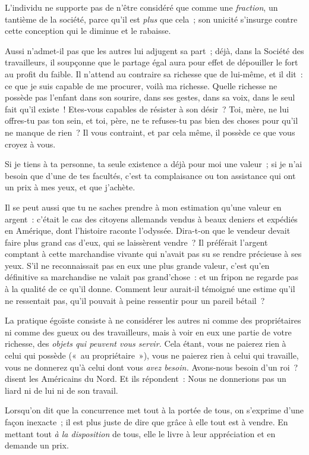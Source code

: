 \documentclass[french,twoside]{book} %
\begin{document}
L’individu ne supporte pas de n’être considéré que comme une \emph{fraction}, un tantième de la société, parce qu’il est \emph{plus} que cela ; son unicité s’insurge contre cette conception qui le diminue et le rabaisse.\par
Aussi n’admet-il pas que les autres lui adjugent sa part ; déjà, dans la Société des travailleurs, il soupçonne  que le partage égal aura pour effet de dépouiller le fort au profit du faible. Il n’attend au contraire sa richesse que de lui-même, et il dit : ce que je suis capable de me procurer, voilà ma richesse. Quelle richesse ne possède pas l’enfant dans son sourire, dans ses gestes, dans sa voix, dans le seul fait qu’il existe ! Etes-vous capables de résister à son désir ? Toi, mère, ne lui offres-tu pas ton sein, et toi, père, ne te refuses-tu pas bien des choses pour qu’il ne manque de rien ? Il vous contraint, et par cela même, il possède ce que vous croyez à vous.\par
Si je tiens à ta personne, ta seule existence a déjà pour moi une valeur ; si je n’ai besoin que d’une de tes facultés, c’est ta complaisance ou ton assistance qui ont un prix à mes yeux, et que j’achète.\par
Il se peut aussi que tu ne saches prendre à mon estimation qu’une valeur en argent : c’était le cas des citoyens allemands vendus à beaux deniers et expédiés en Amérique, dont l’histoire raconte l’odyssée. Dira-t-on que le vendeur devait faire plus grand cas d’eux, qui se laissèrent vendre ? Il préférait l’argent comptant à cette marchandise vivante qui n’avait pas su se rendre précieuse à ses yeux. S’il ne reconnaissait pas en eux une plus grande valeur, c’est qu’en définitive sa marchandise ne valait pas grand’chose : et un fripon ne regarde pas à la qualité de ce qu’il donne. Comment leur aurait-il témoigné une estime qu’il ne ressentait pas, qu’il pouvait à peine ressentir pour un pareil bétail ?\par
La pratique égoïste consiste à ne considérer les autres ni comme des propriétaires ni comme des gueux ou des travailleurs, mais à voir en eux une partie de votre richesse, des \emph{objets qui peuvent vous servir. }Cela étant, vous ne paierez rien à celui qui possède (« au propriétaire »), vous ne paierez rien à celui qui travaille, vous ne donnerez qu’à celui dont vous \emph{avez besoin.} Avons-nous besoin d’un roi ? disent les Américains du Nord. Et ils répondent : Nous ne donnerions  pas un liard ni de lui ni de son travail.\par
Lorsqu’on dit que la concurrence met tout à la portée de tous, on s’exprime d’une façon inexacte ; il est plus juste de dire que grâce à elle tout est à vendre. En mettant tout \emph{à la disposition} de tous, elle le livre à leur appréciation et en demande un prix.\par
\end{document}
